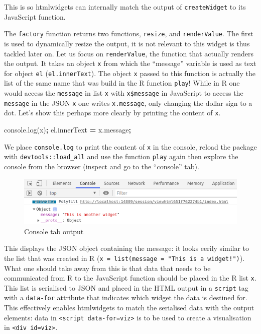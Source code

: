 \documentclass[
]{krantz}
\makeatletter
\newenvironment{Shaded}{\begin{snugshade}}{\end{snugshade}}
\newcommand{\AttributeTok}[1]{\textcolor[rgb]{0.61,0.61,0.61}{#1}}
\newcommand{\NormalTok}[1]{#1}
\newcommand{\OperatorTok}[1]{\textcolor[rgb]{0.43,0.43,0.43}{\textbf{#1}}}
\newcommand{\VariableTok}[1]{\textcolor[rgb]{0,0,0}{#1}}
\newenvironment{kframe}{%
\medskip{}
\setlength{\fboxsep}{.8em}
 \def\at@end@of@kframe{}%
 \ifinner\ifhmode%
  \def\at@end@of@kframe{\end{minipage}}%
  \begin{minipage}{\columnwidth}%
 \fi\fi%
 \def\FrameCommand##1{\hskip\@totalleftmargin \hskip-\fboxsep
 \colorbox{shadecolor}{##1}\hskip-\fboxsep
     \hskip-\linewidth \hskip-\@totalleftmargin \hskip\columnwidth}%
 \MakeFramed {\advance\hsize-\width
   \@totalleftmargin\z@ \linewidth\hsize
   \@setminipage}}%
 {\par\unskip\endMakeFramed%
 \at@end@of@kframe}
\renewenvironment{Shaded}{\begin{kframe}}{\end{kframe}}
\makeatother
\begin{document}
This is so htmlwidgets can internally match the output of \texttt{createWidget} to its JavaScript function.

The \texttt{factory} function returns two functions, \texttt{resize}, and \texttt{renderValue}. The first is used to dynamically resize the output, it is not relevant to this widget is thus tackled later on. Let us focus on \texttt{renderValue}, the function that actually renders the output. It takes an object \texttt{x} from which the ``message'' variable is used as text for object \texttt{el} (\texttt{el.innerText}). The object \texttt{x} passed to this function is actually the list of the same name that was build in the R function \texttt{play}! While in R one would access the \texttt{message} in list \texttt{x} with \texttt{x\$message} in JavaScript to access the \texttt{message} in the JSON \texttt{x} one writes \texttt{x.message}, only changing the dollar sign to a dot. Let's show this perhaps more clearly by printing the content of \texttt{x}.

\begin{Shaded}
\begin{Highlighting}[]
\VariableTok{console}\NormalTok{.}\AttributeTok{log}\NormalTok{(x)}\OperatorTok{;}
\VariableTok{el}\NormalTok{.}\AttributeTok{innerText} \OperatorTok{=} \VariableTok{x}\NormalTok{.}\AttributeTok{message}\OperatorTok{;}
\end{Highlighting}
\end{Shaded}

We place \texttt{console.log} to print the content of \texttt{x} in the console, reload the package with \texttt{devtools::load\_all} and use the function \texttt{play} again then explore the console from the browser (inspect and go to the ``console'' tab).

\begin{figure}
\centering
\includegraphics{images/playground-console-x.png}
\caption{Console tab output}
\end{figure}

This displays the JSON object containing the message: it looks eerily similar to the list that was created in R (\texttt{x\ =\ list(message\ =\ "This\ is\ a\ widget!")}). What one should take away from this is that data that needs to be communicated from R to the JavaScript function should be placed in the R list \texttt{x}. This list is serialised to JSON and placed in the HTML output in a \texttt{script} tag with a \texttt{data-for} attribute that indicates which widget the data is destined for. This effectively enables htmlwidgets to match the serialised data with the output elements: data in \texttt{\textless{}script\ data-for=\textquotesingle{}viz\textquotesingle{}\textgreater{}} is to be used to create a visualisation in \texttt{\textless{}div\ id=\textquotesingle{}viz\textquotesingle{}\textgreater{}}.
\end{document}
